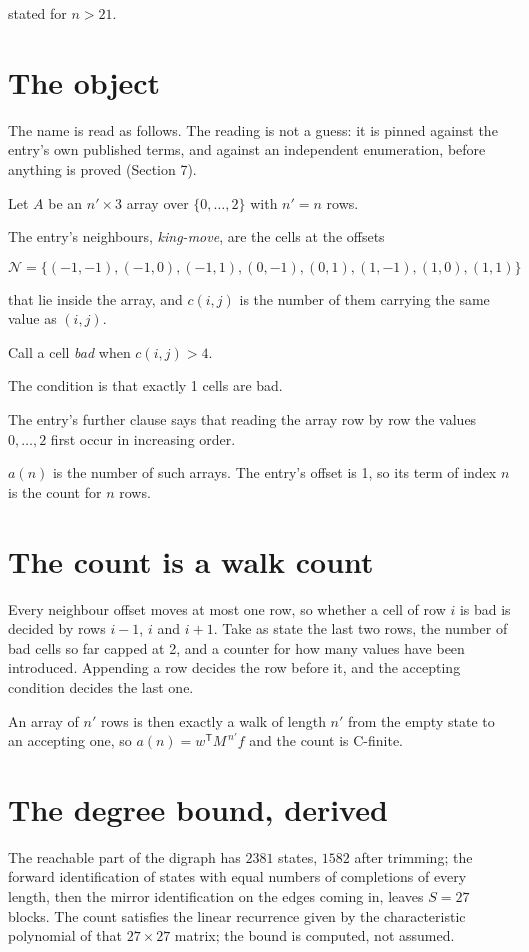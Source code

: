 \documentclass[11pt]{article}
\theoremstyle{definition}
\begin{document}
stated for $n > 21$.

\section{The object}

The name is read as follows. The reading is not a guess: it is pinned against the entry's own published terms, and against an independent enumeration, before anything is proved (Section 7).

Let $A$ be an $n' \times 3$ array over $\{0,\dots,2\}$ with $n' = n$ rows.

The entry's neighbours, {\itshape king-move}, are the cells at the offsets

\[\mathcal{N} = \{(-1,-1), (-1,0), (-1,1), (0,-1), (0,1), (1,-1), (1,0), (1,1)\}\]

that lie inside the array, and $c(i,j)$ is the number of them carrying the same value as $(i,j)$.

Call a cell {\itshape bad} when $c(i,j) > 4$.

The condition is that exactly 1 cells are bad.

The entry's further clause says that reading the array row by row the values $0,\dots,2$ first occur in increasing order.

$a(n)$ is the number of such arrays. The entry's offset is 1, so its term of index $n$ is the count for $n$ rows.

\section{The count is a walk count}

Every neighbour offset moves at most one row, so whether a cell of row $i$ is bad is decided by rows $i-1$, $i$ and $i+1$. Take as state the last two rows, the number of bad cells so far capped at 2, and a counter for how many values have been introduced. Appending a row decides the row before it, and the accepting condition decides the last one.

An array of $n'$ rows is then exactly a walk of length $n'$ from the empty state to an accepting one, so $a(n) = w^{\mathsf T}M^{\,n'}f$ and the count is C-finite.

\section{The degree bound, derived}

The reachable part of the digraph has $2381$ states, $1582$ after trimming; the forward identification of states with equal numbers of completions of every length, then the mirror identification on the edges coming in, leaves $S = 27$ blocks. The count satisfies the linear recurrence given by the characteristic polynomial of that $27\times27$ matrix; the bound is computed, not assumed.
\end{document}
